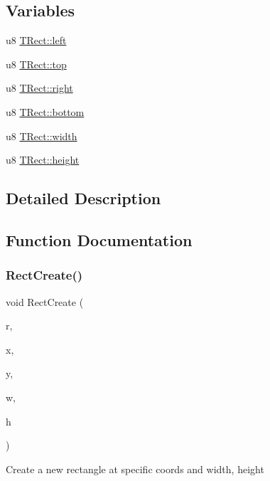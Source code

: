 \subsection*{Variables}
\begin{DoxyCompactItemize}
\item 
u8 \mbox{\hyperlink{group__TRect_gabf4bc428ae2b560efda3c60687a73f00}{T\+Rect\+::left}}
\item 
u8 \mbox{\hyperlink{group__TRect_ga145b5ca0d242dc39c33f1fa72dd04056}{T\+Rect\+::top}}
\item 
u8 \mbox{\hyperlink{group__TRect_gae2a5778c81eb1e464703e1a563e7dcf0}{T\+Rect\+::right}}
\item 
u8 \mbox{\hyperlink{group__TRect_ga225c7bff13bd2bb02d55a517f4c34eb2}{T\+Rect\+::bottom}}
\item 
u8 \mbox{\hyperlink{group__TRect_ga1a0b1f4f8d316782395a16e4b88bc66f}{T\+Rect\+::width}}
\item 
u8 \mbox{\hyperlink{group__TRect_ga8808bb53b01ed90c0d41b3360a9f6b95}{T\+Rect\+::height}}
\end{DoxyCompactItemize}


\subsection{Detailed Description}


\subsection{Function Documentation}
\mbox{\label{group__TRect_gaec082007d22f2533dccd8e2542514401}} 
\subsubsection{\texorpdfstring{RectCreate()}{RectCreate()}}
{\footnotesize\ttfamily void Rect\+Create (\begin{DoxyParamCaption}\item[{\mbox{\hyperlink{structTRect}{T\+Rect}} $\ast$}]{r,  }\item[{u8}]{x,  }\item[{u8}]{y,  }\item[{u8}]{w,  }\item[{u8}]{h }\end{DoxyParamCaption})}

Create a new rectangle at specific coords and width, height


